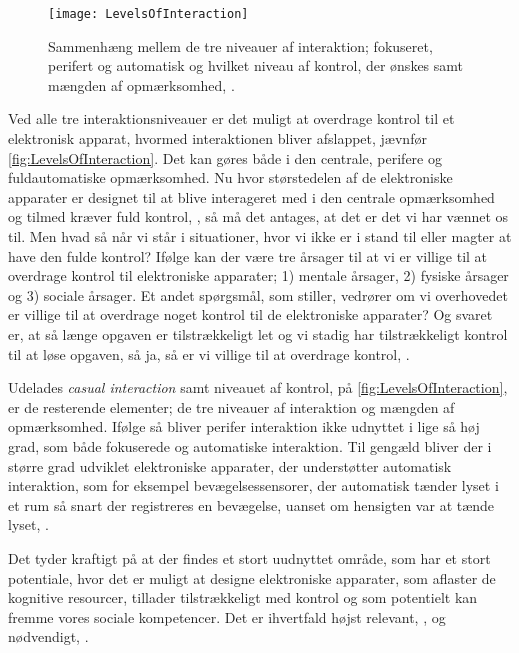 %
\begin{figure}[H]
	\centering
	\texttt{[image: LevelsOfInteraction]}
	\caption{Sammenhæng mellem de tre niveauer af interaktion; fokuseret, perifert og automatisk og hvilket niveau af kontrol, der ønskes samt mængden af opmærksomhed,  \parencite[s. 118]{PDF:PeripheralInteraction}.}
	\label{fig:LevelsOfInteraction}
\end{figure}
\noindent
%
Ved alle tre interaktionsniveauer er det muligt at overdrage kontrol til et elektronisk apparat, hvormed interaktionen bliver afslappet, jævnfør \autoref{fig:LevelsOfInteraction}. Det kan gøres både i den centrale, perifere og fuldautomatiske opmærksomhed. Nu hvor størstedelen af de elektroniske apparater er designet til at blive interageret med i den centrale opmærksomhed og tilmed kræver fuld kontrol, \parencite[s. 118]{PDF:PeripheralInteraction}, så må det antages, at det er det vi har vænnet os til. Men hvad så når vi står i situationer, hvor vi ikke er i stand til eller magter at have den fulde kontrol? Ifølge \textcite[s. 123]{PDF:PeripheralInteraction} kan der være tre årsager til at vi er villige til at overdrage kontrol til elektroniske apparater; 1) mentale årsager, 2) fysiske årsager og 3) sociale årsager. Et andet spørgsmål, som \textcite[s. 124]{PDF:PeripheralInteraction} stiller, vedrører om vi overhovedet er villige til at overdrage noget kontrol til de elektroniske apparater? Og svaret er, at så længe opgaven er tilstrækkeligt let og vi stadig har tilstrækkeligt kontrol til at løse opgaven, så ja, så er vi villige til at overdrage kontrol, \parencite[s. 124]{PDF:PeripheralInteraction}.

Udelades \textit{casual interaction} samt niveauet af kontrol, på \autoref{fig:LevelsOfInteraction}, er de resterende elementer; de tre niveauer af interaktion og mængden af opmærksomhed. Ifølge \textcite[s. 6]{PDF:PeripheralInteraction} så bliver perifer interaktion ikke udnyttet i lige så høj grad, som både fokuserede og automatiske interaktion. Til gengæld bliver der i større grad udviklet elektroniske apparater, der understøtter automatisk interaktion, som for eksempel bevægelsessensorer, der automatisk tænder lyset i et rum så snart der registreres en bevægelse, uanset om  hensigten var at tænde lyset, \parencite[s. 5]{PDF:PeripheralInteraction}. 

Det tyder kraftigt på at der findes et stort uudnyttet område, som har et stort potentiale, hvor det er muligt at designe elektroniske apparater, som aflaster de kognitive resourcer, tillader tilstrækkeligt med kontrol og som potentielt kan fremme vores sociale kompetencer. Det er ihvertfald højst relevant, \parencite[s. 239]{PDF:PICharacteristicsAndConsiderations}, og nødvendigt, \parencite[s. 3]{PDF:TheComingAgeOfCalmTech}.     





 
